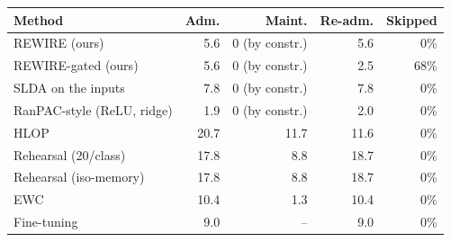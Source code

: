 \begin{tabular}{lrrrr}
\toprule
Method & Adm. & Maint. & Re-adm. & Skipped \\
\midrule
REWIRE (ours) & 5.6 & 0 (by constr.) & 5.6 & 0\% \\
REWIRE-gated (ours) & 5.6 & 0 (by constr.) & 2.5 & 68\% \\
SLDA on the inputs & 7.8 & 0 (by constr.) & 7.8 & 0\% \\
RanPAC-style (ReLU, ridge) & 1.9 & 0 (by constr.) & 2.0 & 0\% \\
HLOP & 20.7 & 11.7 & 11.6 & 0\% \\
Rehearsal (20/class) & 17.8 & 8.8 & 18.7 & 0\% \\
Rehearsal (iso-memory) & 17.8 & 8.8 & 18.7 & 0\% \\
EWC & 10.4 & 1.3 & 10.4 & 0\% \\
Fine-tuning & 9.0 & -- & 9.0 & 0\% \\
\bottomrule
\end{tabular}
